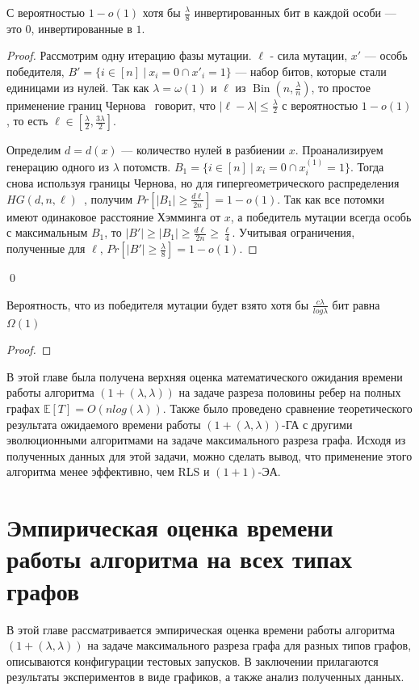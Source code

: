 \documentclass[times]{itmo-student-thesis}
\newcommand{\alglambda}{${(1 + (\lambda , \lambda))}$\xspace}
\newcommand{\alglambdaf}{${(1 + (\lambda , \lambda))}$-ГА\xspace}
\newcommand{\oea}{\mbox{$(1 + 1)$-ЭА}\xspace}
\DeclareMathOperator{\Bin}{Bin}
\begin{document}
\begin{lemma}\label{lem:mut1}
С вероятностью $1- o(1)$ хотя бы $\frac{\lambda}{8}$ инвертированных бит в каждой особи --- это $0$, инвертированные в $1$.
\end{lemma}

\begin{proof}
Рассмотрим одну итерацию фазы мутации. $\ell$ - сила мутации, $x'$ --- особь победителя, $B' = \{i \in [n] ~|~ x_i = 0 \cap x'_i = 1\}$ --- набор битов, которые стали единицами из нулей.
Так как $\lambda = \omega(1)$ и $\ell$ из $\Bin\left(n, \frac{\lambda}{n}\right)$, то простое применение границ Чернова~\cite{ссылка} говорит, что $|\ell - \lambda| \le \frac{\lambda}{2}$ с вероятностью $1- o(1)$, то есть $\ell \in [\frac{\lambda}{2}, \frac{3\lambda}{2}]$.

Определим $d = d(x)$ --- количество нулей в разбиении $x$. Проанализируем генерацию одного из $\lambda$ потомств. $B_1 = \{i \in [n] ~|~ x_i = 0 \cap x^{(1)}_i = 1\}$. Тогда снова используя границы Чернова, но для гипергеометрического распределения $HG(d, n, \ell)$~\cite{ссылка}, получим $Pr[|B_1| \ge \frac{d\ell}{2n}] = 1 - o(1)$.
Так как все потомки имеют одинаковое расстояние Хэмминга от $x$, а победитель мутации всегда особь с максимальным $B_1$, то $|B'| \ge |B_1| \ge \frac{d\ell}{2n} \ge \frac{\ell}{4}$. Учитывая ограничения, полученные для $\ell$, $Pr[|B'| \ge \frac{\lambda}{8}] = 1 - o(1)$.
\end{proof}\qed

\begin{lemma}\label{lem:mut2}
Вероятность, что из победителя мутации будет взято хотя бы $\frac{c\lambda}{log\lambda}$ бит равна $\Omega(1)$
\end{lemma}

\begin{proof}

\end{proof}
\chapterconclusion

В этой главе была получена верхняя оценка математического ожидания времени работы алгоритма \alglambda на задаче разреза половины ребер на полных графах $\mathbb{E}[T]=O(nlog(\lambda))$. Также было проведено сравнение теоретического результата ожидаемого времени работы \alglambdaf с другими эволюционными алгоритмами на задаче максимального разреза графа. Исходя из полученных данных для этой задачи, можно сделать вывод, что применение этого алгоритма менее эффективно, чем RLS и \oea.


\chapter{Эмпирическая оценка времени работы алгоритма на всех типах графов}
В этой главе рассматривается эмпирическая оценка времени работы алгоритма \alglambda на задаче максимального разреза графа для разных типов графов, описываются конфигурации тестовых запусков. В заключении прилагаются результаты экспериментов в виде графиков, а также анализ полученных данных.
\end{document}
